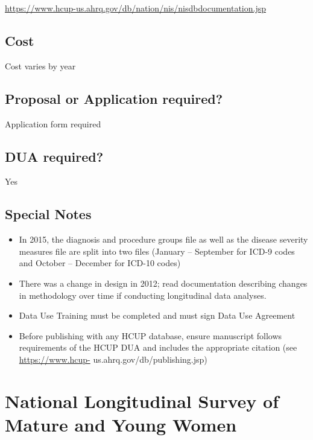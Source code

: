 \documentclass[
]{book}
\providecommand{\tightlist}{%
  \setlength{\itemsep}{0pt}\setlength{\parskip}{0pt}}
\begin{document}
\url{https://www.hcup-us.ahrq.gov/db/nation/nis/nisdbdocumentation.jsp}

\hypertarget{cost-54}{%
\section{Cost}\label{cost-54}}

Cost varies by year

\hypertarget{proposal-or-application-required-54}{%
\section{Proposal or Application required?}\label{proposal-or-application-required-54}}

Application form required

\hypertarget{dua-required-54}{%
\section{DUA required?}\label{dua-required-54}}

Yes

\hypertarget{special-notes-54}{%
\section{Special Notes}\label{special-notes-54}}

\begin{itemize}
\tightlist
\item
  In 2015, the diagnosis and procedure groups file as well as the disease severity measures file are split into two files (January -- September for ICD-9 codes and October -- December for ICD-10 codes)
\item
  There was a change in design in 2012; read documentation describing changes in methodology over time if conducting longitudinal data analyses.
\item
  Data Use Training must be completed and must sign Data Use Agreement
\item
  Before publishing with any HCUP database, ensure manuscript follows requirements of the HCUP DUA and includes the appropriate citation (see \url{https://www.hcup-} us.ahrq.gov/db/publishing.jsp)
\end{itemize}

\mainmatter

\hypertarget{national-longitudinal-survey-of-mature-and-young-women}{%
\chapter{National Longitudinal Survey of Mature and Young Women}\label{national-longitudinal-survey-of-mature-and-young-women}}
\end{document}
